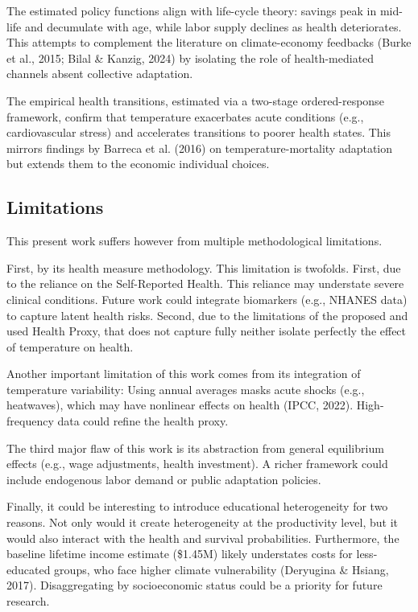 \documentclass{article}
\begin{document}
The estimated policy functions align with life-cycle theory: savings peak in mid-life and decumulate with age, while labor supply declines as health deteriorates.
This attempts to complement the literature on climate-economy feedbacks (Burke et al., 2015; Bilal \& Kanzig, 2024) by isolating the role of health-mediated channels absent collective adaptation.

The empirical health transitions, estimated via a two-stage ordered-response framework, confirm that temperature exacerbates acute conditions (e.g., cardiovascular stress) and accelerates transitions to poorer health states.
This mirrors findings by Barreca et al. (2016) on temperature-mortality adaptation but extends them to the economic individual choices.

\subsection{Limitations}

This present work suffers however from multiple methodological limitations.

First, by its health measure methodology. 
This limitation is twofolds. 
First, due to the reliance on the Self-Reported Health.
This reliance may understate severe clinical conditions.
Future work could integrate biomarkers (e.g., NHANES data) to capture latent health risks.
Second, due to the limitations of the proposed and used Health Proxy,
that does not capture fully neither isolate perfectly the effect of temperature on health.

Another important limitation of this work comes from its integration of temperature variability:
Using annual averages masks acute shocks (e.g., heatwaves), which may have nonlinear effects on health (IPCC, 2022).
High-frequency data could refine the health proxy.

The third major flaw of this work is its abstraction from general equilibrium effects (e.g., wage adjustments, health investment).
A richer framework could include endogenous labor demand or public adaptation policies.

Finally, it could be interesting to introduce educational heterogeneity for two reasons. 
Not only would it create heterogeneity at the productivity level, but it would also interact with 
the health and survival probabilities.
Furthermore, the baseline lifetime income estimate (\$1.45M) likely understates costs for less-educated groups, who face higher climate vulnerability (Deryugina \& Hsiang, 2017).
Disaggregating by socioeconomic status could be a priority for future research.
\end{document}

